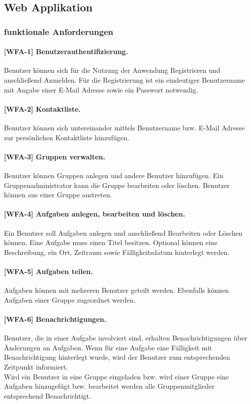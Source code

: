 \subsection{Web Applikation}
\subsubsection{funktionale Anforderungen}

\paragraph{[WFA-1] Benutzerauthentifizierung.} Benutzer können sich für die Nutzung der Anwendung Registrieren und anschließend Anmelden. Für die Registrierung ist ein eindeutiger Benutzername mit Angabe einer E-Mail Adresse sowie ein Passwort notwendig.

\paragraph{[WFA-2] Kontaktliste.} Benutzer können sich untereinander mittels Benutzername bzw. E-Mail Adresse zur persönlichen Kontaktliste hinzufügen.

\paragraph{[WFA-3] Gruppen verwalten. } Benutzer können Gruppen anlegen und andere Benutzer hinzufügen. Ein Gruppenadministrator kann die Gruppe bearbeiten oder löschen. Benutzer können aus einer Gruppe austreten.

\paragraph{[WFA-4] Aufgaben anlegen, bearbeiten und löschen.} Ein Benutzer soll Aufgaben anlegen und anschließend Bearbeiten oder Löschen können.
Eine Aufgabe muss einen Titel besitzen. Optional können eine Beschreibung, ein Ort, Zeitraum sowie Fälligkeitsdatum hinterlegt werden.

\paragraph{[WFA-5] Aufgaben teilen.} Aufgaben können mit mehreren Benutzer geteilt werden. Ebenfalls können Aufgaben einer Gruppe zugeordnet werden. 

\paragraph{[WFA-6] Benachrichtigungen.} Benutzer, die in einer Aufgabe involviert sind, erhalten Benachrichtigungen über Änderungen an Aufgaben. Wenn für eine Aufgabe eine Fälligkeit mit Benachrichtigung hinterlegt wurde, wird der Benutzer zum entsprechenden Zeitpunkt informiert.\\
Wird ein Benutzer in eine Gruppe eingeladen bzw. wird einer Gruppe eine Aufgaben hinzugefügt bzw. bearbeitet werden alle Gruppenmitglieder entsprechend Benachrichtigt.

